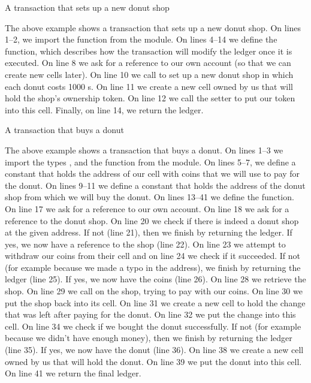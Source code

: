 \begin{example}{A transaction that sets up a new donut shop}



\end{example}

The above example shows a transaction that sets up a new donut shop. On lines 1--2, we import the  function from the  module. On lines 4--14 we define the  function, which describes how the transaction will modify the ledger once it is executed. On line 8 we ask for a reference to our own account (so that we can create new cells later). On line 10 we call  to set up a new donut shop in which each donut costs 1000 s. On line 11 we create a new cell owned by us that will hold the shop's ownership token. On line 12 we call the setter to put our token into this cell. Finally, on line 14, we return the ledger.

\begin{example}{A transaction that buys a donut}



\end{example}

The above example shows a transaction that buys a donut. On lines 1--3 we import the types ,  and the function  from the  module. On lines 5--7, we define a constant that holds the address of our cell with coins that we will use to pay for the donut. On lines 9--11 we define a constant that holds the address of the donut shop from which we will buy the donut. On lines 13--41 we define the  function. On line 17 we ask for a reference to our own account. On line 18 we ask for a reference to the donut shop. On line 20 we check if there is indeed a donut shop at the given address. If not (line 21), then we finish by returning the ledger. If yes, we now have a reference to the shop (line 22). On line 23 we attempt to withdraw our coins from their cell and on line 24 we check if it succeeded. If not (for example because we made a typo in the address), we finish by returning the ledger (line 25). If yes, we now have the coins (line 26). On line 28 we retrieve the shop. On line 29 we call  on the shop, trying to pay with our coins. On line 30 we put the shop back into its cell. On line 31 we create a new cell to hold the change that was left after paying for the donut. On line 32 we put the change into this cell. On line 34 we check if we bought the donut successfully. If not (for example because we didn't have enough money), then we finish by returning the ledger (line 35). If yes, we now have the donut (line 36). On line 38 we create a new cell owned by us that will hold the donut. On line 39 we put the donut into this cell. On line 41 we return the final ledger.

